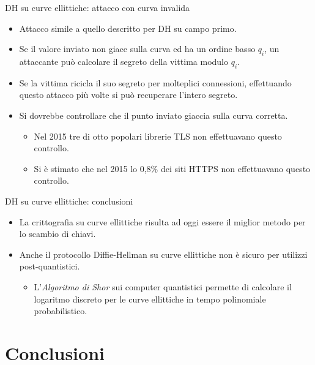 \documentclass[11pt,svgnames,smaller,aspectratio=169,italian]{beamer}
\begin{document}
\begin{frame}{DH su curve ellittiche: attacco con curva invalida}
	\begin{itemize}
		\item Attacco simile a quello descritto per DH su campo primo.
		\item Se il valore inviato non giace sulla curva ed ha un ordine basso $q_{i}$, un attaccante può calcolare il segreto della vittima modulo $q_{i}$.
		\item Se la vittima ricicla il suo segreto per molteplici connessioni, effettuando questo attacco più volte si può recuperare l'intero segreto.
		\item Si dovrebbe controllare che il punto inviato giaccia sulla curva corretta.
			\begin{itemize}
				\item Nel 2015 tre di otto popolari librerie TLS non effettuavano questo controllo.
				\item Si è stimato che nel 2015 lo 0,8\% dei siti HTTPS non effettuavano questo controllo.
			\end{itemize}
	\end{itemize}
\end{frame}

\begin{frame}{DH su curve ellittiche: conclusioni}
	\begin{itemize}
		\item La crittografia su curve ellittiche risulta ad oggi essere il miglior metodo per lo scambio di chiavi.
		\item Anche il protocollo Diffie-Hellman su curve ellittiche non è sicuro per utilizzi post-quantistici.
			\begin{itemize}
				\item L'\emph{Algoritmo di Shor} sui computer quantistici permette di calcolare il logaritmo discreto per le curve ellittiche in tempo polinomiale probabilistico.
			\end{itemize}
	\end{itemize}
\end{frame}

\section{Conclusioni}
\begin{frame}
	\sectionpage
	\centering
\end{frame}
\end{document}
